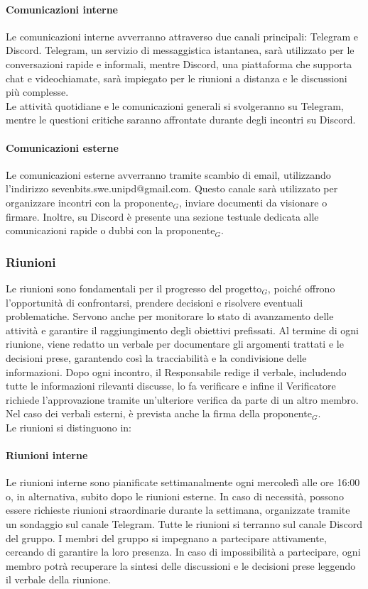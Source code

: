 \documentclass[10pt]{article}
\begin{document}
\begin{justify}
        \paragraph{Comunicazioni interne}
        Le comunicazioni interne avverranno attraverso due canali principali: Telegram e Discord. Telegram, un servizio di messaggistica istantanea, sarà utilizzato per le conversazioni rapide e informali, mentre Discord, una piattaforma che supporta chat e videochiamate, sarà impiegato per le riunioni a distanza e le discussioni più complesse.\\
        Le attività quotidiane e le comunicazioni generali si svolgeranno su Telegram, mentre le questioni critiche saranno affrontate durante degli incontri su Discord.

        \paragraph{Comunicazioni esterne}
        Le comunicazioni esterne avverranno tramite scambio di email, utilizzando l'indirizzo sevenbits.swe.unipd@gmail.com. Questo canale sarà utilizzato per organizzare incontri con la proponente$_G$, inviare documenti da visionare o firmare. Inoltre, su Discord è presente una sezione testuale dedicata alle comunicazioni rapide o dubbi con la proponente$_G$.

    \subsubsection{Riunioni}
    Le riunioni sono fondamentali per il progresso del progetto$_G$, poiché offrono l'opportunità di confrontarsi, prendere decisioni e risolvere eventuali problematiche. Servono anche per monitorare lo stato di avanzamento delle attività e garantire il raggiungimento degli obiettivi prefissati.
    Al termine di ogni riunione, viene redatto un verbale per documentare gli argomenti trattati e le decisioni prese, garantendo così la tracciabilità e la condivisione delle informazioni. Dopo ogni incontro, il Responsabile redige il verbale, includendo tutte le informazioni rilevanti discusse, lo fa verificare e infine il Verificatore richiede l'approvazione tramite un'ulteriore verifica da parte di un altro membro. Nel caso dei verbali esterni, è prevista anche la firma della proponente$_G$.\\
    Le riunioni si distinguono in:

        \paragraph{Riunioni interne}
        Le riunioni interne sono pianificate settimanalmente ogni mercoledì alle ore 16:00 o, in alternativa, subito dopo le riunioni esterne. In caso di necessità, possono essere richieste riunioni straordinarie durante la settimana, organizzate tramite un sondaggio sul canale Telegram. Tutte le riunioni si terranno sul canale Discord del gruppo. I membri del gruppo si impegnano a partecipare attivamente, cercando di garantire la loro presenza. In caso di impossibilità a partecipare, ogni membro potrà recuperare la sintesi delle discussioni e le decisioni prese leggendo il verbale della riunione.


\end{justify}
\end{document}

